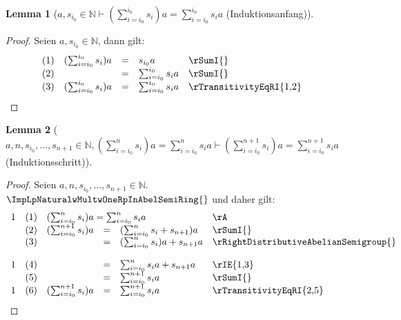 \documentclass{book}
\theoremstyle{plain}
\newtheorem*{lemma}{Lemma}
\theoremstyle{remark}
\theoremstyle{definition}
\begin{document}
\label{awsSubLbiSubZeroRbInNaturalImpLpSumSubLbiEqualsiSubZeroRbPowerLbiSubZeroRbsSubiRpaEqualsSumSubLbiEqualsiSubZeroRbPowerLbiSubZeroRbsSubia}
\begin{lemma}[\(a,s_{i_0}\in\mathbb{N}\vdash (\sum_{i=i_0}^{i_0} s_i)a=\sum_{i=i_0}^{i_0} s_ia\) (Induktionsanfang)]
\end{lemma}
\begin{proof}
    Seien \(a,s_{i_0}\in\mathbb{N}\), dann gilt:
    \[
	\begin{array}{llcll p{5cm}}
              &  (1)  & (\sum_{i=i_0}^{i_0} s_i)a &=& s_{i_0}a & \rSumI{} \\
              &  (2)  &  &=& \sum_{i=i_0}^{i_0} s_ia & \rSumI{} \\
              &  (3)  &  (\sum_{i=i_0}^{i_0} s_i)a&=& \sum_{i=i_0}^{i_0} s_ia & \rTransitivityEqRI{1,2} \\
        \end{array}
    \]
\end{proof}

\label{awnwsSubLbiSubZeroRbwDotswsSubLbnPlusOneRbInNaturalwLpSumSubLbiEqualsiSubZeroRbPowerLbnRbsSubiRpaEqualsSumSubLbiEqualsiSubZeroRbPowerLbnRbsSubiaImpLpSumSubLbiEqualsiSubZeroRbPowerLbnPlusOneRbsSubiRpaEqualsSumSubLbiEqualsiSubZeroRbPowerLbnPlusOneRbsSubia}
\begin{lemma}[\(a,n,s_{i_0},\dots,s_{n+1}\in\mathbb{N},(\sum_{i=i_0}^{n} s_i)a=\sum_{i=i_0}^{n} s_ia\vdash (\sum_{i=i_0}^{n+1} s_i)a=\sum_{i=i_0}^{n+1} s_ia\) (Induktionsschritt)]
\end{lemma}
\begin{proof}
    Seien \(a,n,s_{i_0},\dots,s_{n+1}\in\mathbb{N}\). \(\ImpLpNaturalwMultwOneRpInAbelSemiRing{}\) und daher gilt:
    \[
	\begin{array}{llcll p{5cm}}
            1 &  (1)  & \multicolumn{3}{l}{(\sum_{i=i_0}^{n} s_i)a=\sum_{i=i_0}^{n} s_ia} & \rA \\
              &  (2)  & (\sum_{i=i_0}^{n+1} s_i)a &=& (\sum_{i=i_0}^{n} s_i+s_{n+1})a & \rSumI{} \\
              &  (3)  &  &=& (\sum_{i=i_0}^{n} s_i)a+s_{n+1}a & \rRightDistributiveAbelianSemigroup{} \\
            1 &  (4)  &  &=& \sum_{i=i_0}^{n} s_ia+s_{n+1}a & \rIE{1,3} \\
              &  (5)  &  &=& \sum_{i=i_0}^{n+1} s_ia & \rSumI{} \\
            1 &  (6)  & (\sum_{i=i_0}^{n+1} s_i)a &=& \sum_{i=i_0}^{n+1} s_ia & \rTransitivityEqRI{2,5} \\
        \end{array}
    \]
\end{proof}
\end{document}
